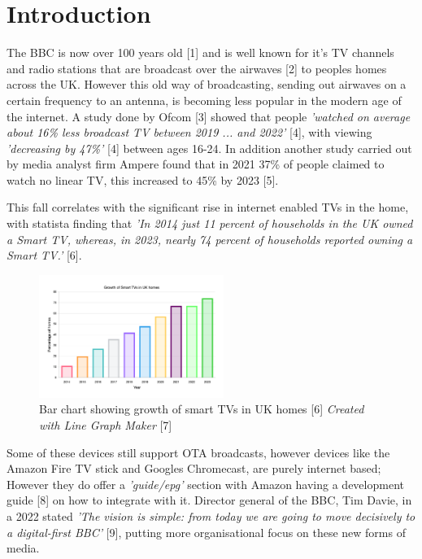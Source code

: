 \section{Introduction}

  The BBC is now over 100 years old [1] and is well known for it's TV channels and radio stations that are broadcast over the airwaves [2] 
  to peoples homes across the UK. However this old way of broadcasting, sending out airwaves on a certain frequency to an antenna, is becoming 
  less popular in the modern age of the internet. A study done by Ofcom [3] showed that people
  \textit{'watched on average about 16\% less broadcast TV between 2019 ... and 2022'} [4], with viewing \textit{'decreasing by 47\%'} [4] between ages
  16-24. In addition another study carried out by media analyst firm Ampere found that in 2021 37\% of people claimed to watch no linear TV,
  this increased to 45\% by 2023 [5].
  
  This fall correlates with the significant rise in internet enabled TVs in the home, with statista finding that 
  \textit{'In 2014 just 11 percent of households in the UK owned a Smart TV, whereas, in 2023, nearly 74 percent of households reported owning a Smart TV.'} [6].

  \begin{figure}[H]
    \centering
    \includegraphics[width=6cm]{assets/smartTvGrowth.png}
    \caption{Bar chart showing growth of smart TVs in UK homes [6] \textit{Created with Line Graph Maker} [7]}
    \label{fig:smartTvGrowth}
  \end{figure}

  Some of these devices still support OTA broadcasts, however devices like the Amazon Fire TV stick and Googles Chromecast, are purely internet
  based; However they do offer a \textit{'guide/epg'} section with Amazon having a development guide [8] on how to integrate with it.
  Director general of the BBC, Tim Davie, in a 2022 stated \textit{'The vision is simple: from today we are going to move decisively to 
  a digital-first BBC'} [9], putting more organisational focus on these new forms of media. 
  
